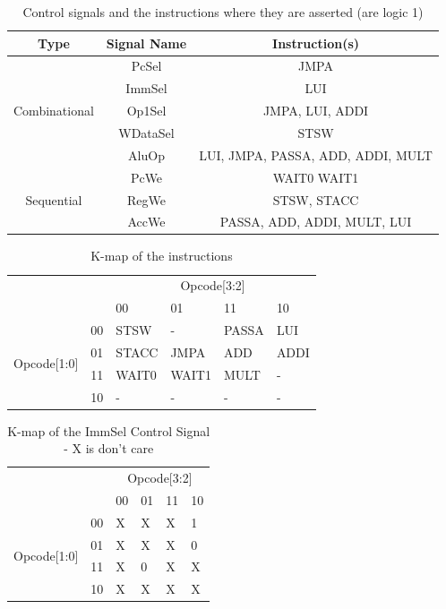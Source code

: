 \begin{table}
\caption{Control signals and the instructions where they are asserted (are logic 1)}
\label{tab:controlsignals}
\centering
\begin{tabular}{|c|c|c|} \hline
Type & Signal Name & Instruction(s) \\ \hline
\multirow{5}{*}{Combinational} & PcSel & JMPA \\ 
 & ImmSel & LUI \\
 & Op1Sel & JMPA, LUI, ADDI \\
 & WDataSel & STSW \\ 
 & AluOp & LUI, JMPA, PASSA, ADD, ADDI, MULT \\ \hline
\multirow{3}{*}{Sequential} & PcWe & WAIT0 WAIT1 \\
 & RegWe & STSW, STACC \\
 & AccWe &  PASSA, ADD, ADDI, MULT, LUI \\ \hline

\end{tabular}
\end{table}



\begin{table}
\caption{K-map of the instructions}
\label{tab:kmap}
\centering
\begin{tabular}{|c|c|p{1.5cm}p{1.5cm}p{1.5cm}p{1.5cm}|}\cline{3-6}
\multicolumn{2}{c|}{} & \multicolumn{4}{|c|}{Opcode[3:2]} \\ \cline{3-6}
\multicolumn{2}{c|}{} 			& 00	& 01	& 11	& 10	\\  \hline
\multirow{4}{*}{Opcode[1:0]} 	& 00 	& STSW	& -	& PASSA	& LUI	\\
				& 01 	& STACC	& JMPA	& ADD	& ADDI	\\
				& 11 	& WAIT0	& WAIT1	& MULT	& -	\\
				& 10 	& -	& -	& -	& -	\\ \hline

\end{tabular}
\end{table}

\begin{table}
\caption{K-map of the ImmSel Control Signal - X is don't care}
\label{tab:kmap:immsel}
\centering
\begin{tabular}{|c|c|p{1.5cm}p{1.5cm}p{1.5cm}p{1.5cm}|}\cline{3-6}
\multicolumn{2}{c|}{} & \multicolumn{4}{|c|}{Opcode[3:2]} \\ \cline{3-6}
\multicolumn{2}{c|}{} 			& 00	& 01	& 11	& 10	\\  \hline
\multirow{4}{*}{Opcode[1:0]} 	& 00 	& X	& X	& X	& 1	\\
				& 01 	& X	& X	& X	& 0	\\
				& 11 	& X	& 0 	& X	& X	\\
				& 10 	& X	& X	& X	& X	\\ \hline

\end{tabular}
\end{table}


